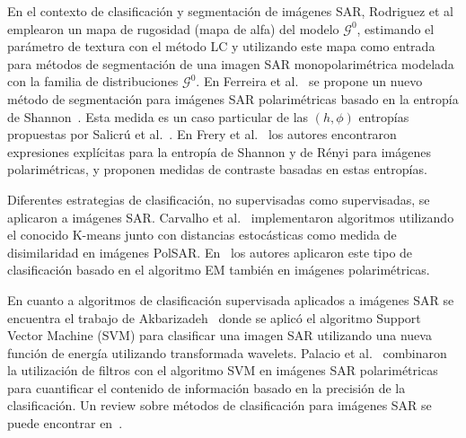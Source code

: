 \documentclass[12pt]{article}
\begin{document}
En el contexto de clasificación y segmentación de imágenes SAR, Rodriguez et al~\cite{Rodrigues2016} emplearon un mapa de rugosidad (mapa de alfa) del modelo $\mathcal{G}^0$, estimando el parámetro de textura con el método LC y utilizando este mapa como entrada para métodos de segmentación de una imagen SAR monopolarimétrica modelada con la familia de distribuciones $\mathcal{G}^0$. 
En Ferreira et al.~\cite{Ferreira2020} se propone un nuevo método de segmentación para imágenes SAR polarimétricas basado en la entropía de Shannon~\cite{Shannon1948}. Esta medida es un caso particular de las $(h,\phi)$ entropías propuestas por Salicrú et al.~\cite{salicruetal1993}. 
En Frery et al.~\cite{Frery2012} los autores encontraron expresiones explícitas para la entropía de Shannon y de Rényi para imágenes polarimétricas, y proponen medidas de contraste basadas en estas entropías. 

Diferentes estrategias de clasificación, no supervisadas como supervisadas, se aplicaron a imágenes SAR. Carvalho et al.~\cite{Carvalho2019} implementaron algoritmos utilizando el conocido K-means junto con distancias estocásticas como medida de disimilaridad en imágenes PolSAR. 
En~\cite{Fernandez2017} los autores aplicaron este tipo de clasificación basado en el algoritmo EM también en imágenes polarimétricas. 

En cuanto a algoritmos de clasificación supervisada aplicados a imágenes SAR se encuentra el trabajo de Akbarizadeh~\cite{Akbarizadeh2012} donde se aplicó el algoritmo Support Vector Machine (SVM) para clasificar una imagen SAR utilizando una nueva función de energía utilizando transformada wavelets. 
Palacio et al.~\cite{Palacio2019} combinaron la utilización de filtros con el algoritmo SVM en imágenes SAR polarimétricas para cuantificar el contenido de información basado en la precisión de la clasificación.  Un review sobre métodos de clasificación para imágenes SAR se puede encontrar en~\cite{Parikh2020}. 
\end{document}
